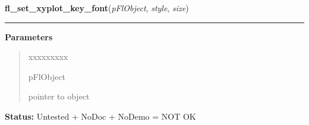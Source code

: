 \hspace{.8\funcindent}\begin{boxedminipage}{\funcwidth}

    \raggedright \textbf{fl\_set\_xyplot\_key\_font}(\textit{pFlObject}, \textit{style}, \textit{size})

    \vspace{-1.5ex}

    \rule{\textwidth}{0.5\fboxrule}
\setlength{\parskip}{2ex}
\setlength{\parskip}{1ex}
      \textbf{Parameters}
      \vspace{-1ex}

      \begin{quote}
        \begin{Ventry}{xxxxxxxxx}

          \item[pFlObject]

          pointer to object

        \end{Ventry}

      \end{quote}

\textbf{Status:} Untested + NoDoc + NoDemo = NOT OK



    \end{boxedminipage}

    \label{xformslib:flxyplot:fl_get_xyplot_numdata}

    \vspace{0.5ex}

